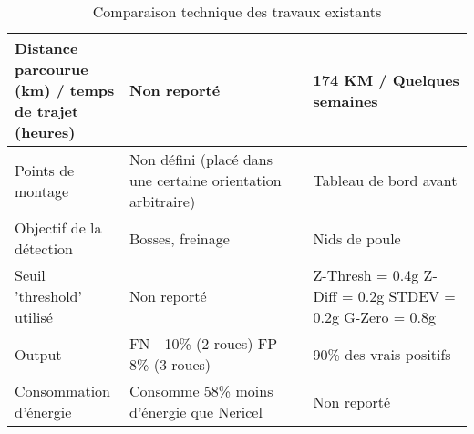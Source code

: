 \begin{table}[]
\begin{tabular}{|m{0.25\linewidth}|m{0.4\linewidth}|m{0.35\linewidth}|}
        \hline
        Distance parcourue (km) / temps de trajet (heures) & Non reporté                                                      & 174 KM / Quelques semaines                               \\
        \hline
        Points de montage                                  & Non défini (placé dans une certaine orientation arbitraire)      & Tableau de bord avant                                    \\
        \hline
        Objectif de la détection                           & Bosses, freinage                                                 & Nids de poule                                            \\
        \hline
        Seuil 'threshold' utilisé                          & Non reporté                                                      & Z-Thresh = 0.4g Z-Diff = 0.2g STDEV = 0.2g G-Zero = 0.8g \\
        \hline
        Output                                             & FN - 10\% (2 roues) FP - 8\% (3 roues)                           & 90\% des vrais positifs                                  \\
        \hline
        Consommation d'énergie                             & Consomme 58\% moins d'énergie que Nericel                        & Non reporté                                              \\
        \hline
    \end{tabular} %

    \caption{Comparaison technique des travaux existants}
    \label{tab:my-table}
\end{table}

